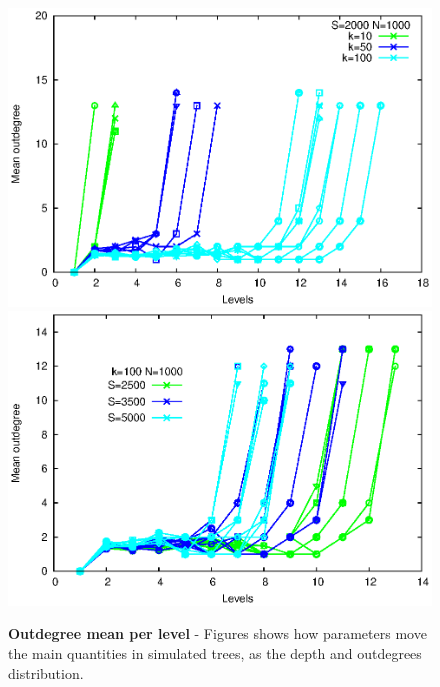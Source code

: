 \begin{figure}[p]%
\includegraphics[width=\textwidth,draft=false]{grafici/VoutVSlev.eps}
\includegraphics[width=\textwidth,draft=false]{grafici/VoutVSlev2.eps}
\caption{\label{KKoutlev} \footnotesize\textbf{Outdegree mean per level} - Figures shows how parameters move the main quantities in simulated trees, as the depth and outdegrees distribution.}
\end{figure}

